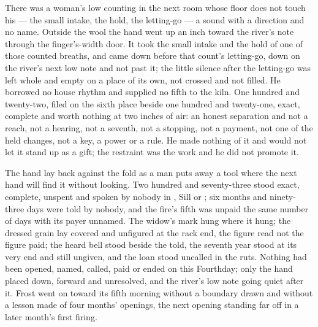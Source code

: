 There was a woman's low counting in the next room whose floor does not touch his --- the small intake, the hold, the letting-go --- a sound with a direction and no name. Outside the wool the hand went up an inch toward the river's note through the finger's-width door. It took the small intake and the hold of one of those counted breaths, and came down before that count's letting-go, down on the river's next low note and not past it; the little silence after the letting-go was left whole and empty on a place of its own, not crossed and not filled. He borrowed no house rhythm and supplied no fifth to the kiln. One hundred and twenty-two, filed on the sixth place beside one hundred and twenty-one, exact, complete and worth nothing at two inches of air: an honest separation and not a reach, not a hearing, not a seventh, not a stopping, not a payment, not one of the held changes, not a key, a power or a rule. He made nothing of it and would not let it stand up as a gift; the restraint was the work and he did not promote it.

The hand lay back against the fold as a man puts away a tool where the next hand will find it without looking. Two hundred and seventy-three stood exact, complete, unspent and spoken by nobody in , Sill or ; six months and ninety-three days were told by nobody, and the fire's fifth was unpaid the same number of days with its payer unnamed. The widow's mark hung where it hung; the dressed grain lay covered and unfigured at the rack end, the figure read not the figure paid; the heard bell stood beside the told, the seventh year stood at its very end and still ungiven, and the loan stood uncalled in the ruts. Nothing had been opened, named, called, paid or ended on this Fourthday; only the hand placed down, forward and unresolved, and the river's low note going quiet after it. Frost went on toward its fifth morning without a boundary drawn and without a lesson made of four months' openings, the next opening standing far off in a later month's first firing.

